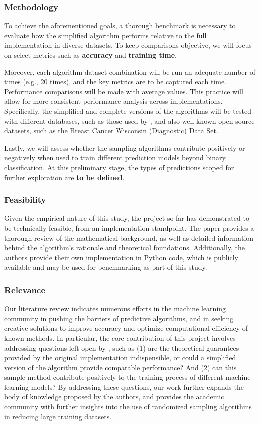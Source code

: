 \documentclass{article}
\theoremstyle{plain}
\theoremstyle{definition}
\theoremstyle{remark}
\begin{document}
\subsubsection{Methodology}

To achieve the aforementioned goals, a thorough benchmark is necessary to evaluate how the simplified algorithm performs relative to the full implementation in diverse datasets. To keep comparisons objective, we will focus on select metrics such as \textbf{accuracy} and \textbf{training time}.

Moreover, each algorithm-dataset combination will be run an adequate number of times (e.g., 20 times), and the key metrics are to be captured each time. Performance comparisons will be made with average values. This practice will allow for more consistent performance analysis across implementations. Specifically, the simplified and complete versions of the algorithms will be tested with different databases, such as those used by \citeauthor{chow24}, and also well-known open-source datasets, such as the Breast Cancer Wisconsin (Diagnostic) Data Set.

Lastly, we will assess whether the sampling algorithms contribute positively or negatively when used to train different prediction models beyond binary classification. At this preliminary stage, the types of predictions scoped for further exploration are \textbf{to be defined}.


\subsubsection{Feasibility}

Given the empirical nature of this study, the project so far has demonstrated to be technically feasible, from an implementation standpoint. The paper \cite{chow24} provides a thorough review of the mathematical background, as well as detailed information behind the algorithm's rationale and theoretical foundations. Additionally, the authors provide their own implementation in Python code, which is publicly available and may be used for benchmarking as part of this study.


\subsubsection{Relevance}

Our literature review indicates numerous efforts in the machine learning community in pushing the barriers of predictive algorithms, and in seeking creative solutions to improve accuracy and optimize computational efficiency of known methods. In particular, the core contribution of this project involves addressing questions left open by \citeauthor{chow24}, such as (1) are the theoretical guarantees provided by the original implementation indispensible, or could a simplified version of the algorithm provide comparable performance? And (2) can this sample method contribute positively to the training process of different machine learning models? By addressing these questions, our work further expands the body of knowledge proposed by the authors, and provides the academic community with further insights into the use of randomized sampling algorithms in reducing large training datasets.
\end{document}
